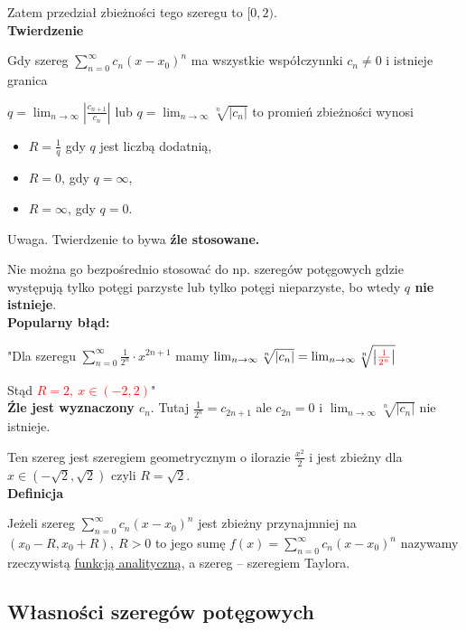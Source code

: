 Zatem przedział zbieżności tego szeregu to $[0, 2)$. \\

\textbf{Twierdzenie}

Gdy szereg $ \sum\limits_{n = 0}^{\infty} c_n(x - x_0)^n $ ma wszystkie współczynnki $ c_n \neq 0 $ i istnieje granica

$ q = \lim_{n \to \infty} \left| \frac{c_{n + 1}}{c_n} \right| $ lub $ q = \lim_{n \to \infty} \sqrt[n]{|c_n|} $
to promień zbieżności wynosi 

\begin{itemize}
    \item $ R = \frac{1}{q} $ gdy $q$ jest liczbą dodatnią,
    \item $ R = 0$, gdy $q = \infty$,
    \item $ R = \infty $, gdy $ q = 0 $. \\
\end{itemize}

Uwaga. Twierdzenie to bywa \textbf{źle stosowane.}

Nie można go bezpośrednio stosować do np. szeregów potęgowych gdzie występują tylko potęgi parzyste lub tylko
potęgi nieparzyste, bo wtedy \textbf{$q$ nie istnieje}. \\

\textbf{Popularny błąd:}

"Dla szeregu $ \sum\limits_{n = 0}^{\infty} \frac{1}{2^n} \cdot x^{2n + 1} $ mamy 
$ \lim_{n \to \infty} \sqrt[n]{|c_n|} = \lim_{n \to \infty} \sqrt[n]{ \left| \textcolor{red}{\frac{1}{2^n}} \right| } $

Stąd \textcolor{red}{$ R = 2, \ x \in (-2, 2) $}" \\

\textbf{Źle jest wyznaczony $c_n$}. Tutaj $ \frac{1}{2^n} = c_{2n + 1} $ ale $ c_{2n} = 0 $ i
$ \lim_{n \to \infty} \sqrt[n]{|c_n|} $ nie istnieje.

Ten szereg jest szeregiem geometrycznym o ilorazie $ \frac{x^2}{2} $ i jest zbieżny dla $ x \in (-\sqrt{2}, \sqrt{2}) $
czyli $ R = \sqrt{2} $. \\

\textbf{Definicja}

Jeżeli szereg $ \sum\limits_{n = 0}^{\infty} c_n(x - x_0)^n $ jest zbieżny przynajmniej na $ (x_0 - R, x_0 + R), \ R > 0 $ to
jego sumę $ f(x) = \sum\limits_{n = 0}^{\infty} c_n(x - x_0)^n $ nazywamy rzeczywistą \underline{funkcją analityczną}, a szereg
-- szeregiem Taylora.


\subsection*{Własności szeregów potęgowych}

